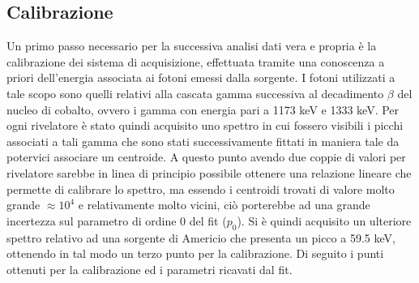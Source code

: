 \subsection{Calibrazione}
Un primo passo necessario per la successiva analisi dati vera e propria è la calibrazione dei sistema di acquisizione, effettuata tramite una conoscenza a priori dell'energia
associata ai fotoni emessi dalla sorgente. I fotoni utilizzati a tale scopo sono quelli relativi alla cascata gamma successiva al decadimento $\beta$ del nucleo di cobalto, ovvero
i gamma con energia pari a 1173 keV e 1333 keV. Per ogni rivelatore è stato quindi acquisito uno spettro in cui fossero visibili i picchi associati a tali gamma che sono stati
successivamente fittati in maniera tale da potervici associare un centroide. A questo punto avendo due coppie di valori per rivelatore sarebbe in linea di principio possibile
ottenere una relazione lineare che permette di calibrare lo spettro, ma essendo i centroidi trovati di valore molto grande $\approx 10^4$ e relativamente molto vicini, ciò
porterebbe ad una grande incertezza sul parametro di ordine 0 del fit ($p_0$). Si è quindi acquisito un ulteriore spettro relativo ad una sorgente di Americio che presenta 
un picco a 59.5 keV, ottenendo in tal modo un terzo punto per la calibrazione. Di seguito i punti ottenuti per la calibrazione ed i parametri ricavati dal fit.
